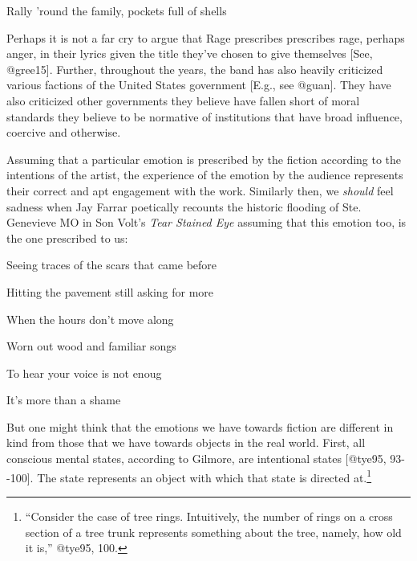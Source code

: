 \documentclass[
  letterpaper,
  DIV=11,
  numbers=noendperiod]{scrartcl}
\theoremstyle{remark}
\begin{document}
Rally 'round the family, pockets full of shells

\noindent Perhaps it is not a far cry to argue that Rage prescribes
prescribes rage, perhaps anger, in their lyrics given the title they've
chosen to give themselves {[}See, @gree15{]}. Further, throughout the
years, the band has also heavily criticized various factions of the
United States government {[}E.g., see @guan{]}. They have also
criticized other governments they believe have fallen short of moral
standards they believe to be normative of institutions that have broad
influence, coercive and otherwise.

Assuming that a particular emotion is prescribed by the fiction
according to the intentions of the artist, the experience of the emotion
by the audience represents their correct and apt engagement with the
work. Similarly then, we \emph{should} feel sadness when Jay Farrar
poetically recounts the historic flooding of Ste. Genevieve MO in Son
Volt's \emph{Tear Stained Eye} assuming that this emotion too, is the
one prescribed to us:

Seeing traces of the scars that came before

Hitting the pavement still asking for more

When the hours don't move along

Worn out wood and familiar songs

To hear your voice is not enoug

It's more than a shame

But one might think that the emotions we have towards fiction are
different in kind from those that we have towards objects in the real
world. First, all conscious mental states, according to Gilmore, are
intentional states {[}@tye95, 93-\/-100{]}. The state represents an
object with which that state is directed at.\footnote{``Consider the
  case of tree rings. Intuitively, the number of rings on a cross
  section of a tree trunk represents something about the tree, namely,
  how old it is,'' @tye95, 100.}
\end{document}
